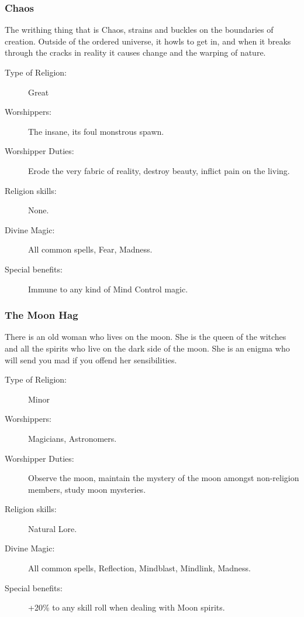 \subsubsection{Chaos}
The writhing thing that is Chaos, strains and buckles on the boundaries of creation. Outside of the ordered universe, it howls to get in, and when it breaks through the cracks in reality it causes change and the warping of nature. 

\begin{description}
\item[Type of Religion:] Great
\item[Worshippers:] The insane, its foul monstrous spawn.
\item[Worshipper Duties:] Erode the very fabric of reality, destroy beauty, inflict pain on the living.
\item[Religion skills:] None.
\item[Divine Magic:] All common spells, Fear, Madness.
\item[Special benefits:] Immune to any kind of Mind Control magic.
\end{description}


\subsubsection{The Moon Hag}
There is an old woman who lives on the moon. She is the queen of the witches and all the spirits who live on the dark side of the moon. She is an enigma who will send you mad if you offend her sensibilities. 

\begin{description}
\item[Type of Religion:] Minor
\item[Worshippers:] Magicians, Astronomers.
\item[Worshipper Duties:] Observe the moon, maintain the mystery of the moon amongst non-religion members, study moon mysteries.
\item[Religion skills:] Natural Lore.
\item[Divine Magic:] All common spells, Reflection, Mindblast, Mindlink, Madness.
\item[Special benefits:] +20\% to any skill roll when dealing with Moon spirits.
\end{description}


